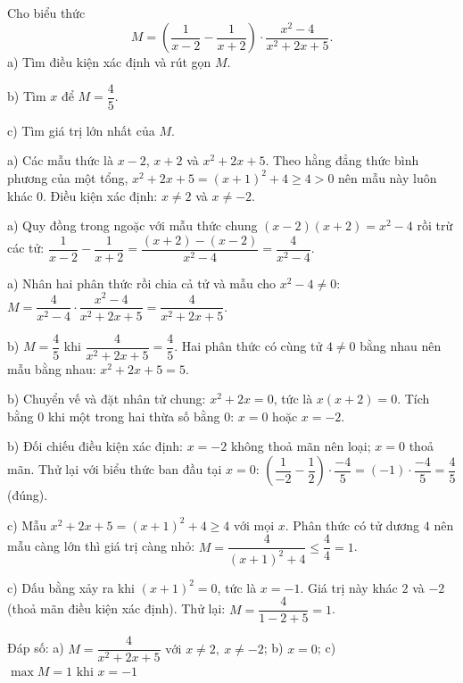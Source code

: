 \begin{problem}[8DS-PS-051]
Cho biểu thức
\[ M = \left(\dfrac{1}{x - 2} - \dfrac{1}{x + 2}\right) \cdot \dfrac{x^2 - 4}{x^2 + 2x + 5}. \]
a) Tìm điều kiện xác định và rút gọn $M$.

b) Tìm $x$ để $M = \dfrac{4}{5}$.

c) Tìm giá trị lớn nhất của $M$.

\begin{solution}
a) Các mẫu thức là $x - 2$, $x + 2$ và $x^2 + 2x + 5$. Theo hằng đẳng thức bình phương của một tổng, $x^2 + 2x + 5 = (x + 1)^2 + 4 \geq 4 > 0$ nên mẫu này luôn khác $0$. Điều kiện xác định: $x \neq 2$ và $x \neq -2$.

a) Quy đồng trong ngoặc với mẫu thức chung $(x - 2)(x + 2) = x^2 - 4$ rồi trừ các tử: $\dfrac{1}{x - 2} - \dfrac{1}{x + 2} = \dfrac{(x + 2) - (x - 2)}{x^2 - 4} = \dfrac{4}{x^2 - 4}$.

a) Nhân hai phân thức rồi chia cả tử và mẫu cho $x^2 - 4 \neq 0$: $M = \dfrac{4}{x^2 - 4} \cdot \dfrac{x^2 - 4}{x^2 + 2x + 5} = \dfrac{4}{x^2 + 2x + 5}$.

b) $M = \dfrac{4}{5}$ khi $\dfrac{4}{x^2 + 2x + 5} = \dfrac{4}{5}$. Hai phân thức có cùng tử $4 \neq 0$ bằng nhau nên mẫu bằng nhau: $x^2 + 2x + 5 = 5$.

b) Chuyển vế và đặt nhân tử chung: $x^2 + 2x = 0$, tức là $x(x + 2) = 0$. Tích bằng $0$ khi một trong hai thừa số bằng $0$: $x = 0$ hoặc $x = -2$.

b) Đối chiếu điều kiện xác định: $x = -2$ không thoả mãn nên loại; $x = 0$ thoả mãn. Thử lại với biểu thức ban đầu tại $x = 0$: $\left(\dfrac{1}{-2} - \dfrac{1}{2}\right) \cdot \dfrac{-4}{5} = (-1) \cdot \dfrac{-4}{5} = \dfrac{4}{5}$ (đúng).

c) Mẫu $x^2 + 2x + 5 = (x + 1)^2 + 4 \geq 4$ với mọi $x$. Phân thức có tử dương $4$ nên mẫu càng lớn thì giá trị càng nhỏ: $M = \dfrac{4}{(x + 1)^2 + 4} \leq \dfrac{4}{4} = 1$.

c) Dấu bằng xảy ra khi $(x + 1)^2 = 0$, tức là $x = -1$. Giá trị này khác $2$ và $-2$ (thoả mãn điều kiện xác định). Thử lại: $M = \dfrac{4}{1 - 2 + 5} = 1$.

Đáp số: a) $\boxed{M = \dfrac{4}{x^2 + 2x + 5} \text{ với } x \neq 2,\ x \neq -2}$; b) $\boxed{x = 0}$; c) $\boxed{\max M = 1 \text{ khi } x = -1}$
\end{solution}
\end{problem}


